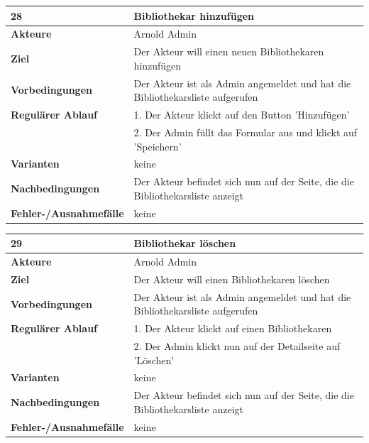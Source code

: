 \documentclass[fontsize=12pt,paper=a4,twoside]{scrartcl}
\begin{document}
\begin{table}[htbp]
\label{28}
\begin{tabular}{|l|p{10cm}|}
\hline 
\textbf{28} & \textbf{Bibliothekar hinzufügen} \\ \hline
\textbf{Akteure} & Arnold Admin\\ \hline
\textbf{Ziel} & Der Akteur will einen neuen Bibliothekaren hinzufügen \\ \hline
\textbf{Vorbedingungen} & Der Akteur ist als Admin angemeldet und hat die Bibliothekarsliste 
aufgerufen \\ \hline
\textbf{Regulärer Ablauf} & 
1. Der Akteur klickt auf den Button 'Hinzufügen' \\
&2. Der Admin füllt das Formular aus und klickt auf 'Speichern'\\
\hline
\textbf{Varianten} & 
keine \\ \hline
\textbf{Nachbedingungen} & Der Akteur befindet sich nun auf der Seite, die die Bibliothekarsliste 
anzeigt\\ \hline
\textbf{Fehler-/Ausnahmefälle} & keine\\
\hline
\end{tabular}
\end{table}


\begin{table}[htbp]
\label{29}
\begin{tabular}{|l|p{10cm}|}
\hline 
\textbf{29} & \textbf{Bibliothekar löschen} \\ \hline
\textbf{Akteure} & Arnold Admin\\ \hline
\textbf{Ziel} & Der Akteur will einen Bibliothekaren löschen \\ \hline
\textbf{Vorbedingungen} & Der Akteur ist als Admin angemeldet und hat die Bibliothekarsliste 
aufgerufen\\\hline
\textbf{Regulärer Ablauf} & 
1. Der Akteur klickt auf einen Bibliothekaren \\
&2. Der Admin klickt nun auf der Detailseite auf 'Löschen'\\
\hline
\textbf{Varianten} & 
keine \\ \hline
\textbf{Nachbedingungen} & Der Akteur befindet sich nun auf der Seite, die die Bibliothekarsliste 
anzeigt\\ \hline
\textbf{Fehler-/Ausnahmefälle} & keine\\
\hline
\end{tabular}
\end{table}
\end{document}
